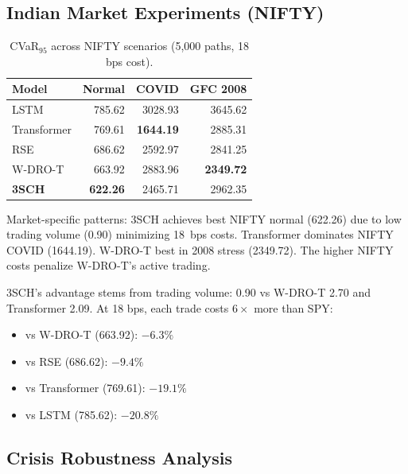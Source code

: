 \subsection{Indian Market Experiments (NIFTY)}

\begin{table}[H]
\centering\small
\caption{CVaR$_{95}$ across NIFTY scenarios (5,000 paths, 18 bps cost).}
\label{tab:nifty}
\begin{tabular}{@{}lrrr@{}}
\toprule
\textbf{Model} & \textbf{Normal} & \textbf{COVID} & \textbf{GFC 2008} \\\midrule
LSTM & 785.62 & 3028.93 & 3645.62 \\
Transformer & 769.61 & \textbf{1644.19} & 2885.31 \\
RSE & 686.62 & 2592.97 & 2841.25 \\
W-DRO-T & 663.92 & 2883.96 & \textbf{2349.72} \\
\textbf{3SCH} & \textbf{622.26} & 2465.71 & 2962.35 \\
\bottomrule
\end{tabular}
\end{table}

Market-specific patterns: 3SCH achieves best NIFTY normal (622.26) due to low trading volume (0.90) minimizing 18~bps costs. Transformer dominates NIFTY COVID (1644.19). W-DRO-T best in 2008 stress (2349.72). The higher NIFTY costs penalize W-DRO-T's active trading.

3SCH's advantage stems from trading volume: 0.90 vs W-DRO-T 2.70 and Transformer 2.09. At 18 bps, each trade costs $6\times$ more than SPY:
\begin{itemize}[noitemsep]
    \item vs W-DRO-T (663.92): $-6.3\%$
    \item vs RSE (686.62): $-9.4\%$
    \item vs Transformer (769.61): $-19.1\%$
    \item vs LSTM (785.62): $-20.8\%$
\end{itemize}

\subsection{Crisis Robustness Analysis}

